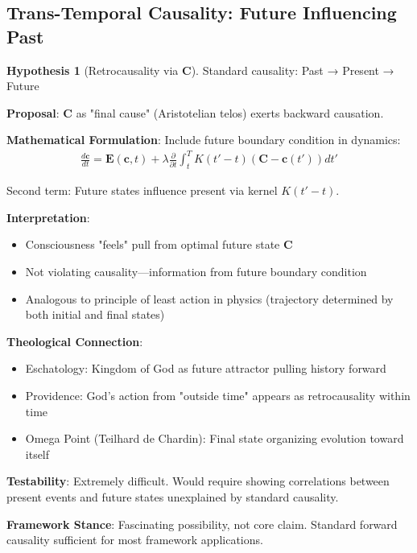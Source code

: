 \documentclass[11pt,a4paper]{article}
\theoremstyle{definition}
\newtheorem{hypothesis}{Hypothesis}[section]
\theoremstyle{remark}
\newcommand{\EE}{\mathbf{E}}
\newcommand{\cc}{\mathbf{c}}
\begin{document}
\begin{small}
\begin{enumerate}
\subsection{Trans-Temporal Causality: Future Influencing Past}

\begin{hypothesis}[Retrocausality via \(\mathbf{C}\)]
Standard causality: Past → Present → Future

\textbf{Proposal}: \(\mathbf{C}\) as "final cause" (Aristotelian telos) exerts backward causation.

\textbf{Mathematical Formulation}: Include future boundary condition in dynamics:
\begin{align}
\frac{d\cc}{dt} = \EE(\cc, t) + \lambda \frac{\partial}{\partial t}\int_t^T K(t'-t)(\mathbf{C} - \cc(t')) dt'
\end{align}

Second term: Future states influence present via kernel \(K(t'-t)\).

\textbf{Interpretation}:
\begin{itemize}
    \item Consciousness "feels" pull from optimal future state \(\mathbf{C}\)
    \item Not violating causality—information from future boundary condition
    \item Analogous to principle of least action in physics (trajectory determined by both initial and final states)
\end{itemize}

\textbf{Theological Connection}:
\begin{itemize}
    \item Eschatology: Kingdom of God as future attractor pulling history forward
    \item Providence: God's action from "outside time" appears as retrocausality within time
    \item Omega Point (Teilhard de Chardin): Final state organizing evolution toward itself
\end{itemize}

\textbf{Testability}: Extremely difficult. Would require showing correlations between present events and future states unexplained by standard causality.

\textbf{Framework Stance}: Fascinating possibility, not core claim. Standard forward causality sufficient for most framework applications.
\end{hypothesis}


\end{enumerate}
\end{small}
\end{document}
